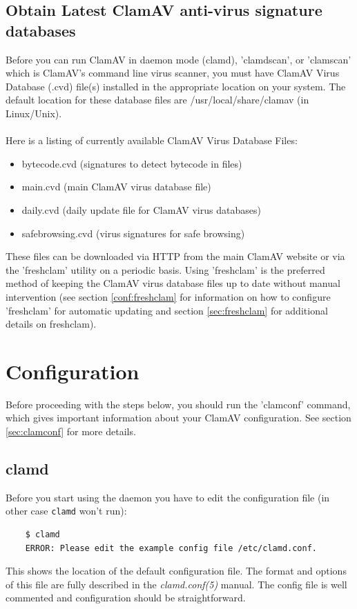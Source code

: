 \documentclass[a4paper,titlepage,12pt]{article}
\begin{document}
    \subsection{Obtain Latest ClamAV anti-virus signature databases}
    Before you can run ClamAV in daemon mode (clamd), 'clamdscan',
    or 'clamscan' which is ClamAV's command line virus scanner,
    you must have ClamAV Virus Database (.cvd) file(s) installed
    in the appropriate location on your system.  The default
    location for these database files are /usr/local/share/clamav
    (in Linux/Unix).
    \\\\
    Here is a listing of currently available ClamAV Virus Database Files:
    \begin{itemize}
           \item bytecode.cvd        (signatures to detect bytecode in files)
           \item main.cvd            (main ClamAV virus database file)
           \item daily.cvd           (daily update file for ClamAV virus databases)
           \item safebrowsing.cvd    (virus signatures for safe browsing)
    \end{itemize}
    These files can be downloaded via HTTP from the main ClamAV website
    or via the 'freshclam' utility on a periodic basis.  Using 'freshclam'
    is the preferred method of keeping the ClamAV virus database files
    up to date without manual intervention (see section \ref{conf:freshclam} for
    information on how to configure 'freshclam' for automatic updating and section
    \ref{sec:freshclam} for additional details on freshclam).

    \section{Configuration}
    Before proceeding with the steps below, you should
    run the 'clamconf' command, which gives important information
    about your ClamAV configuration. See section \ref{sec:clamconf} 
    for more details.

    \subsection{clamd}
    Before you start using the daemon you have to edit the configuration file
    (in other case \verb+clamd+ won't run):
    \begin{verbatim}
	$ clamd
	ERROR: Please edit the example config file /etc/clamd.conf.
    \end{verbatim}
    This shows the location of the default configuration file. The format and
    options of this file are fully described in the \emph{clamd.conf(5)}
    manual. The config file is well commented and configuration should be
    straightforward.
\end{document}
